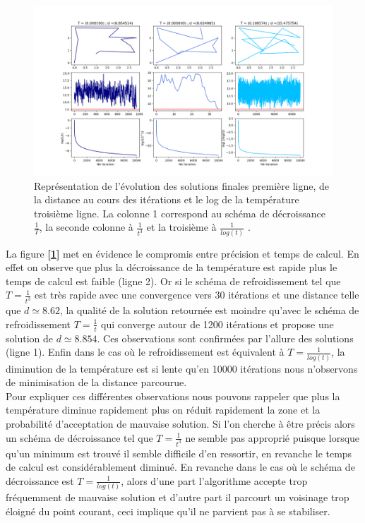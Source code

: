 \documentclass[12pt]{article}
\begin{document}
\begin{figure}[H]
\centering
\includegraphics[width=1\textwidth]{schema_refroissement.png}
\caption{Représentation de l'évolution des solutions finales première ligne, de la distance au cours des itérations et le log de la température troisième ligne. La colonne 1 correspond au schéma de décroissance $\frac{1}{T}$, la seconde colonne à $\frac{1}{t^3}$ et la troisième à $\frac{1}{log(t)}$ .}
\label{refroidissement}
\end{figure}
 La figure \textbf{[\ref{refroidissement}]} met en évidence le compromis entre précision et temps de calcul. En effet on observe que plus  la décroissance de la température est rapide plus le temps de calcul est faible (ligne 2). Or si le schéma de refroidissement tel que $T = \frac{1}{t^3}$ est très rapide avec une convergence vers 30 itérations et une distance telle que $d\simeq 8.62$, la qualité de la solution retournée est moindre qu'avec le schéma de refroidissement $T  = \frac{1}{t}$ qui converge autour de 1200 itérations et propose une solution de $d\simeq8.854$. Ces observations sont confirmées par l'allure des solutions (ligne 1). Enfin  dans le cas où le refroidissement est équivalent à $T  = \frac{1}{log(t)}$, la diminution de la température est si lente qu'en 10000 itérations nous n'observons de minimisation de la distance parcourue.\\
Pour expliquer ces différentes observations nous pouvons rappeler que plus la température diminue rapidement plus on réduit rapidement la zone  et la probabilité d'acceptation de mauvaise solution. Si l'on cherche à être précis alors un schéma de décroissance tel que $T =\frac{1}{t^3}$ ne semble pas approprié puisque lorsque qu'un minimum est trouvé il semble difficile d'en ressortir, en revanche le temps de calcul est considérablement diminué. En revanche dans le cas où le schéma de décroissance est $T = \frac{1}{log(t)}$, alors d'une part l'algorithme accepte trop fréquemment de mauvaise solution et d'autre part il parcourt un voisinage trop éloigné du point courant, ceci implique qu'il ne parvient pas à se stabiliser.
\end{document}
